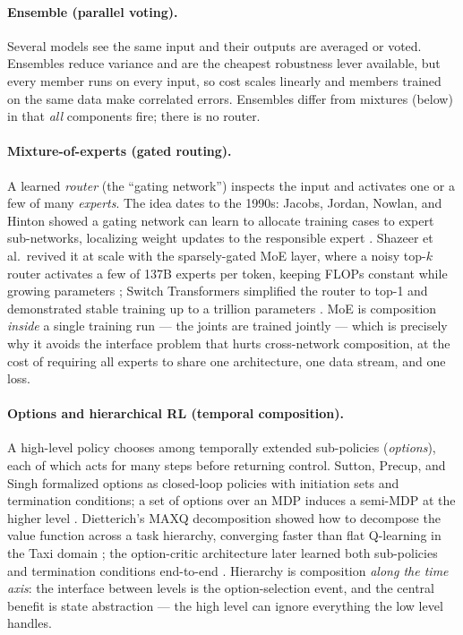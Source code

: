 \documentclass[11pt]{article}
\begin{document}
\paragraph{Ensemble (parallel voting).} Several models see the same input and their outputs are averaged or voted. Ensembles reduce variance and are the cheapest robustness lever available, but every member runs on every input, so cost scales linearly and members trained on the same data make correlated errors. Ensembles differ from mixtures (below) in that \emph{all} components fire; there is no router.

\paragraph{Mixture-of-experts (gated routing).} A learned \emph{router} (the ``gating network'') inspects the input and activates one or a few of many \emph{experts}. The idea dates to the 1990s: Jacobs, Jordan, Nowlan, and Hinton showed a gating network can learn to allocate training cases to expert sub-networks, localizing weight updates to the responsible expert \cite{jacobs1991adaptive}. Shazeer et al.\ revived it at scale with the sparsely-gated MoE layer, where a noisy top-$k$ router activates a few of 137B experts per token, keeping FLOPs constant while growing parameters \cite{shazeer2017sparsely}; Switch Transformers simplified the router to top-1 and demonstrated stable training up to a trillion parameters \cite{fedus2022switch}. MoE is composition \emph{inside} a single training run --- the joints are trained jointly --- which is precisely why it avoids the interface problem that hurts cross-network composition, at the cost of requiring all experts to share one architecture, one data stream, and one loss.

\paragraph{Options and hierarchical RL (temporal composition).} A high-level policy chooses among temporally extended sub-policies (\emph{options}), each of which acts for many steps before returning control. Sutton, Precup, and Singh formalized options as closed-loop policies with initiation sets and termination conditions; a set of options over an MDP induces a semi-MDP at the higher level \cite{sutton1999options}. Dietterich's MAXQ decomposition showed how to decompose the value function across a task hierarchy, converging faster than flat Q-learning in the Taxi domain \cite{dietterich2000maxq}; the option-critic architecture later learned both sub-policies and termination conditions end-to-end \cite{bacon2017optioncritic}. Hierarchy is composition \emph{along the time axis}: the interface between levels is the option-selection event, and the central benefit is state abstraction --- the high level can ignore everything the low level handles.
\end{document}
